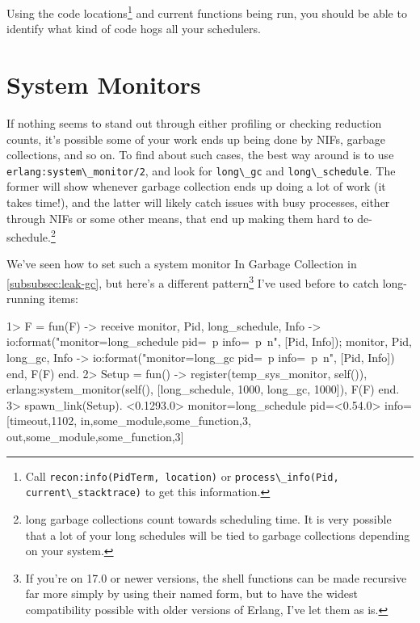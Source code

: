 \documentclass[11pt, oneside]{book}   	%
\newcommand{\function}[1]{\Verb`#1`}
\newcommand{\expression}[1]{\Verb`#1`}
\newcommand{\term}[1]{\Verb`#1`}
\begin{document}
Using the code locations\footnote{Call \expression{recon:info(PidTerm, location)} or \expression{process\_info(Pid, current\_stacktrace)} to get this information.} and current functions being run, you should be able to identify what kind of code hogs all your schedulers.

\section{System Monitors}
\label{sec:cpu-system-monitors}

If nothing seems to stand out through either profiling or checking reduction counts, it's possible some of your work ends up being done by NIFs, garbage collections, and so on. To find about such cases, the best way around is to use \function{erlang:system\_monitor/2}, and look for \term{long\_gc} and \term{long\_schedule}. The former will show whenever garbage collection ends up doing a lot of work (it takes time!), and the latter will likely catch issues with busy processes, either through NIFs or some other means, that end up making them hard to de-schedule.\footnote{long garbage collections count towards scheduling time. It is very possible that a lot of your long schedules will be tied to garbage collections depending on your system.}

We've seen how to set such a system monitor In Garbage Collection in \ref{subsubsec:leak-gc}, but here's a different pattern\footnote{If you're on 17.0 or newer versions, the shell functions can be made recursive far more simply by using their named form, but to have the widest compatibility possible with older versions of Erlang, I've let them as is.} I've used before to catch long-running items:

\begin{VerbatimEshell}
1> F = fun(F) ->
    receive
        {monitor, Pid, long_schedule, Info} ->
            io:format("monitor=long_schedule pid=~p info=~p~n", [Pid, Info]);
        {monitor, Pid, long_gc, Info} -> 
            io:format("monitor=long_gc pid=~p info=~p~n", [Pid, Info])
    end,
    F(F)
end.
2> Setup = fun() -> 
     register(temp_sys_monitor, self()),
     erlang:system_monitor(self(), [{long_schedule, 1000}, {long_gc, 1000}]),
     F(F)
end.
3> spawn_link(Setup).
<0.1293.0>
monitor=long_schedule pid=<0.54.0> info=[{timeout,1102},
                                         {in,{some_module,some_function,3}},
                                         {out,{some_module,some_function,3}}]
\end{VerbatimEshell}
\end{document}
